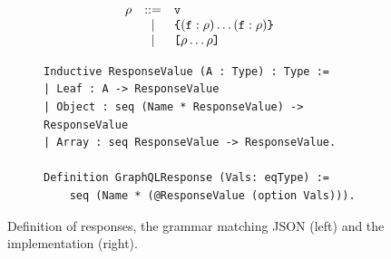 \begin{figure}[h]
\centering
\begin{subfigure}{.5\textwidth}

  \begin{displaymath}
	\begin{array}{rcl}
	\rho & ::= & \texttt{v}\\
	& | & \texttt{\{} (\texttt{f} : \rho) \ldots (\texttt{f} : \rho) \texttt{\}} \\
	& | & \texttt{[} \rho \ldots \rho \texttt{]}
	\end{array}
	\end{displaymath}
	
	

 
  \end{subfigure}%
  \begin{subfigure}{.5\textwidth}
\begin{verbatim}
Inductive ResponseValue (A : Type) : Type :=
| Leaf : A -> ResponseValue
| Object : seq (Name * ResponseValue) -> ResponseValue
| Array : seq ResponseValue -> ResponseValue.

Definition GraphQLResponse (Vals: eqType) :=
    seq (Name * (@ResponseValue (option Vals))).
\end{verbatim}
   
  \end{subfigure}
  \caption{Definition of \gql responses, the grammar matching JSON (left) and the \coq implementation (right).
  }
  \label{fig:response_def}

\end{figure}
%






